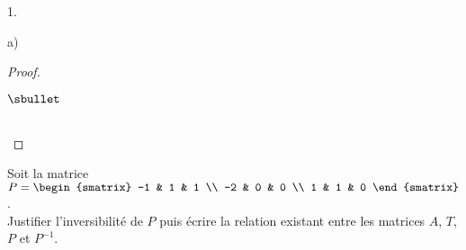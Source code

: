 \documentclass[11pt]{article}%
\begin{document}
\begin{noliste}{1.}
\begin{noliste}{a)}
\begin{proof}
\begin{remarkL}{.98}
\begin{noliste}{$\sbullet$}
      \end{noliste}
    \end{remarkL}~\\[-1.5cm]
    \end{proof}

  \end{noliste}

\item Soit la matrice $P =
  \begin{smatrix}
    -1 & 1 & 1 \\
    -2 & 0 & 0 \\
    1 & 1 & 0
  \end{smatrix}
  $.\\
  Justifier l'inversibilité de $P$ puis écrire la relation existant
  entre les matrices $A$, $T$, $P$ et $P^{-1}$.


\end{noliste}
\end{document}
